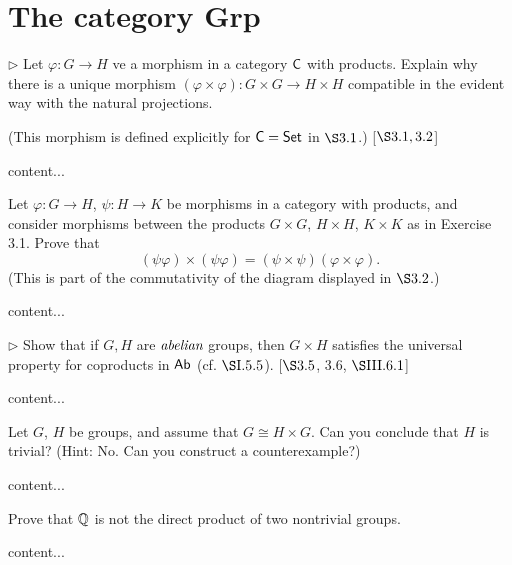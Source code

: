 \section{The category \textsf{Grp}}
\extitle

\begin{exercise}
	$\triangleright$ Let $\varphi\colon G \to H$ ve a morphism in a category $\textsf{C}$ with products. Explain why there is a unique morphism $(\varphi\times\varphi)\colon G\times G \to H \times H$ compatible in the evident way with the natural projections. 
	
	(This morphism is defined explicitly for $\textsf{C} = \textsf{Set}$ in $\S 3.1$.) [$\S 3.1, 3.2$]
\end{exercise}
\begin{solution}
	content...
\end{solution}

\begin{exercise}
	Let $\varphi \colon G \to H$, $\psi\colon H \to K$ be morphisms in a category with products, and consider morphisms between the products $G\times G$, $H\times H$, $K\times K$ as in Exercise 3.1. Prove that
	\[
		(\psi\varphi)\times(\psi\varphi) = (\psi\times\psi)(\varphi \times \varphi).
	\]
	(This is part of the commutativity of the diagram displayed in $\S 3.2$.)
\end{exercise}
\begin{solution}
	content...
\end{solution}

\begin{exercise}
	$\triangleright$ Show that if $G,H$ are $\emph{abelian}$ groups, then $G\times H$ satisfies the universal property for coproducts in $\textsf{Ab}$ (cf. $\S \RNo{1}.5.5$). [$\S 3.5$, 3.6, $\S \RNo{3}.6.1$]
\end{exercise}
\begin{solution}
	content...
\end{solution}

\begin{exercise}
	Let $G$, $H$ be groups, and assume that $G \cong H \times G$. Can you conclude that $H$ is trivial? (Hint: No. Can you construct a counterexample?)
\end{exercise}
\begin{solution}
	content...
\end{solution}

\begin{exercise}
	Prove that $\mathbb{Q}$ is not the direct product of two nontrivial groups.
\end{exercise}
\begin{solution}
	content...
\end{solution}

